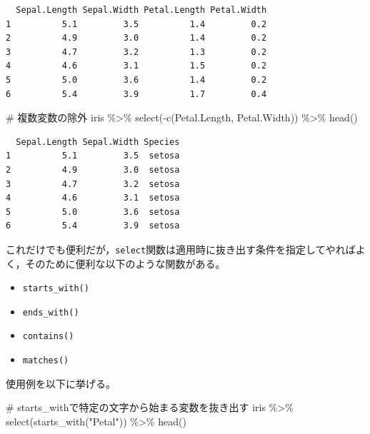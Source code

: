 \documentclass[
  a4paper,
]{ltjsbook}
\newenvironment{Shaded}{\begin{snugshade}}{\end{snugshade}}
\newcommand{\CommentTok}[1]{\textcolor[rgb]{0.37,0.37,0.37}{#1}}
\newcommand{\FunctionTok}[1]{\textcolor[rgb]{0.28,0.35,0.67}{#1}}
\newcommand{\NormalTok}[1]{\textcolor[rgb]{0.00,0.23,0.31}{#1}}
\newcommand{\SpecialCharTok}[1]{\textcolor[rgb]{0.37,0.37,0.37}{#1}}
\newcommand{\StringTok}[1]{\textcolor[rgb]{0.13,0.47,0.30}{#1}}
\providecommand{\tightlist}{%
  \setlength{\itemsep}{0pt}\setlength{\parskip}{0pt}}
\begin{document}
\begin{verbatim}
  Sepal.Length Sepal.Width Petal.Length Petal.Width
1          5.1         3.5          1.4         0.2
2          4.9         3.0          1.4         0.2
3          4.7         3.2          1.3         0.2
4          4.6         3.1          1.5         0.2
5          5.0         3.6          1.4         0.2
6          5.4         3.9          1.7         0.4
\end{verbatim}

\begin{Shaded}
\begin{Highlighting}[]
\CommentTok{\# 複数変数の除外}
\NormalTok{iris }\SpecialCharTok{\%\textgreater{}\%}
  \FunctionTok{select}\NormalTok{(}\SpecialCharTok{{-}}\FunctionTok{c}\NormalTok{(Petal.Length, Petal.Width)) }\SpecialCharTok{\%\textgreater{}\%}
  \FunctionTok{head}\NormalTok{()}
\end{Highlighting}
\end{Shaded}

\begin{verbatim}
  Sepal.Length Sepal.Width Species
1          5.1         3.5  setosa
2          4.9         3.0  setosa
3          4.7         3.2  setosa
4          4.6         3.1  setosa
5          5.0         3.6  setosa
6          5.4         3.9  setosa
\end{verbatim}

これだけでも便利だが，\texttt{select}関数は適用時に抜き出す条件を指定してやればよく，そのために便利な以下のような関数がある。

\begin{itemize}
\tightlist
\item
  \texttt{starts\_with()}
\item
  \texttt{ends\_with()}
\item
  \texttt{contains()}
\item
  \texttt{matches()}
\end{itemize}

使用例を以下に挙げる。

\begin{Shaded}
\begin{Highlighting}[]
\CommentTok{\# starts\_withで特定の文字から始まる変数を抜き出す}
\NormalTok{iris }\SpecialCharTok{\%\textgreater{}\%}
  \FunctionTok{select}\NormalTok{(}\FunctionTok{starts\_with}\NormalTok{(}\StringTok{"Petal"}\NormalTok{)) }\SpecialCharTok{\%\textgreater{}\%}
  \FunctionTok{head}\NormalTok{()}
\end{Highlighting}
\end{Shaded}
\end{document}
